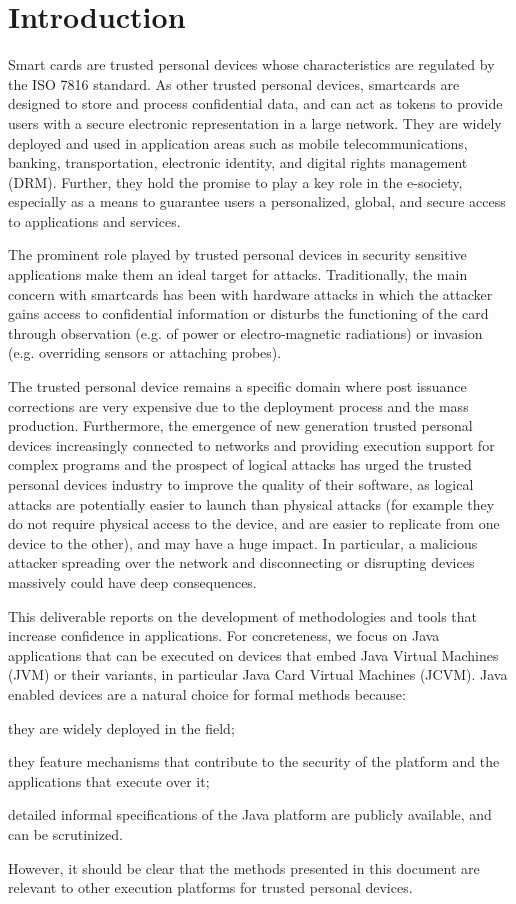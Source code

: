 \chapter{Introduction}


Smart cards are trusted personal devices whose characteristics are
regulated by the ISO 7816 standard. As other trusted personal devices,
smartcards are designed to store and process confidential data, and
can act as tokens to provide users with a secure electronic
representation in a large network. They are widely deployed and used
in application areas such as mobile telecommunications, banking,
transportation, electronic identity, and digital rights management
(DRM). Further, they hold the promise to play a key role in the
e-society, especially as a means to guarantee users a personalized,
global, and secure access to applications and services.


The prominent role played by trusted personal devices in security
sensitive applications make them an ideal target for
attacks. Traditionally, the main concern with smartcards has been with
hardware attacks in which the attacker gains access to confidential
information or disturbs the functioning of the card through
observation (e.g. of power or electro-magnetic radiations) or invasion
(e.g. overriding sensors or attaching probes).

The trusted personal device remains a specific domain where post
issuance corrections are very expensive due to the deployment process
and the mass production. Furthermore, the emergence of new generation
trusted personal devices increasingly connected to networks and
providing execution support for complex programs and the prospect of
logical attacks has urged the trusted personal devices industry to
improve the quality of their software, as logical attacks are
potentially easier to launch than physical attacks (for example they
do not require physical access to the device, and are easier to
replicate from one device to the other), and may have a huge impact.
In particular, a malicious attacker spreading over the network and
disconnecting or disrupting devices massively could have deep consequences.

This deliverable reports on the development of methodologies and tools
that increase confidence in applications.  For concreteness, we focus 
on Java applications that can be executed on devices that embed Java
Virtual Machines (JVM) or their variants, in particular Java Card
Virtual Machines (JCVM). Java enabled devices are a natural choice for
formal methods because:
\begin{inparaenum}[i)]
\item they are widely deployed in the field;
\item they feature mechanisms that contribute to the security of the
platform and the applications that execute over it;
\item detailed informal specifications of the Java platform are publicly
available, and can be scrutinized.
\end{inparaenum}
However, it should be clear that the methods presented in this document
are relevant to other execution platforms for trusted personal devices.


